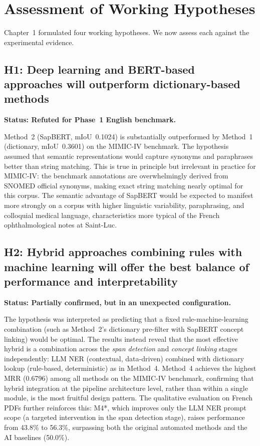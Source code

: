 \section{Assessment of Working Hypotheses}

Chapter~1 formulated four working hypotheses. We now assess each against the experimental evidence.

\subsection*{H1: Deep learning and BERT-based approaches will outperform dictionary-based methods}

\textbf{Status: Refuted for Phase~1 English benchmark.}

Method~2 (SapBERT, mIoU~0.1024) is substantially outperformed by Method~1 (dictionary, mIoU~0.3601) on the MIMIC-IV benchmark. The hypothesis assumed that semantic representations would capture synonyms and paraphrases better than string matching. This is true in principle but irrelevant in practice for MIMIC-IV: the benchmark annotations are overwhelmingly derived from SNOMED official synonyms, making exact string matching nearly optimal for this corpus. The semantic advantage of SapBERT would be expected to manifest more strongly on a corpus with higher linguistic variability, paraphrasing, and colloquial medical language, characteristics more typical of the French ophthalmological notes at Saint-Luc.

\subsection*{H2: Hybrid approaches combining rules with machine learning will offer the best balance of performance and interpretability}

\textbf{Status: Partially confirmed, but in an unexpected configuration.}

The hypothesis was interpreted as predicting that a fixed rule-machine-learning combination (such as Method~2's dictionary pre-filter with SapBERT concept linking) would be optimal. The results instead reveal that the most effective hybrid is a combination across the \textit{span detection} and \textit{concept linking} stages independently: LLM NER (contextual, data-driven) combined with dictionary lookup (rule-based, deterministic) as in Method~4. Method~4 achieves the highest MRR (0.6796) among all methods on the MIMIC-IV benchmark, confirming that hybrid integration at the pipeline architecture level, rather than within a single module, is the most fruitful design pattern. The qualitative evaluation on French PDFs further reinforces this: M4*, which improves only the LLM NER prompt scope (a targeted intervention in the span detection stage), raises performance from 43.8\% to 56.3\%, surpassing both the original automated methods and the AI baselines (50.0\%).

